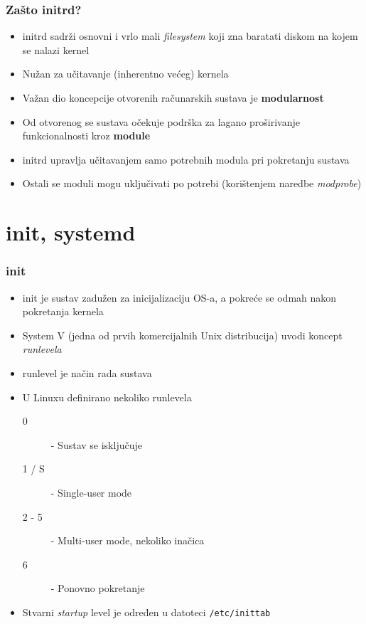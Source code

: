 \documentclass[t]{beamer}
\begin{document}
\begin{frame}
	\frametitle{Zašto initrd?}
	\begin{itemize}
		\item initrd sadrži osnovni i vrlo mali \textit{filesystem} koji zna baratati diskom na kojem se nalazi kernel
		\item Nužan za učitavanje (inherentno većeg) kernela
	\end{itemize}
	\begin{itemize}
		\item Važan dio koncepcije otvorenih računarskih sustava je \textbf{modularnost}
		\item Od otvorenog se sustava očekuje podrška za lagano proširivanje funkcionalnosti kroz \textbf{module}
		\item initrd upravlja učitavanjem samo potrebnih modula pri pokretanju sustava
		\item Ostali se moduli mogu uključivati po potrebi (korištenjem naredbe \textit{modprobe})
	\end{itemize}
\end{frame}



\section{init, systemd}
\begin{frame}
	\frametitle{init}
	\begin{itemize}
		\item init je sustav zadužen za inicijalizaciju OS-a, a pokreće se odmah nakon pokretanja kernela
		\item System V (jedna od prvih komercijalnih Unix distribucija) uvodi koncept \emph{runlevela}
		\item runlevel je način rada sustava
	\end{itemize}
	\begin{itemize}
		\item U Linuxu definirano nekoliko runlevela
		\begin{description}
			\item[0] - Sustav se isključuje
			\item[1 / S] - Single-user mode
			\item[2 - 5] - Multi-user mode, nekoliko inačica
			\item[6] - Ponovno pokretanje
		\end{description}
		\item Stvarni \textit{startup} level je određen u datoteci \texttt{/etc/inittab}
	\end{itemize}
\end{frame}
\end{document}
